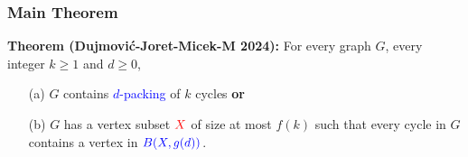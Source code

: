 \documentclass{beamer}
\begin{document}
\begin{frame}
  \frametitle{Main Theorem}

  \noindent\textbf{Theorem (Dujmović-Joret-Micek-M 2024):} For every graph $G$, every integer $k\ge 1$ and $d\ge 0$,
  \begin{enumerate}%
    \item[(a)] $G$ contains \textcolor{blue}{$d$-packing} of $k$ cycles \textbf{or}
    \item[(b)] $G$ has a vertex subset $\mathcolor{red}{X}$ of size at most $f(k)$ such that every cycle in $G$ contains a vertex in $\mathcolor{blue}{B(X, g(d))}$.
  \end{enumerate}
  \begin{minipage}[t][.5\textheight]{\textwidth}
\end{minipage}
\end{frame}
\end{document}
